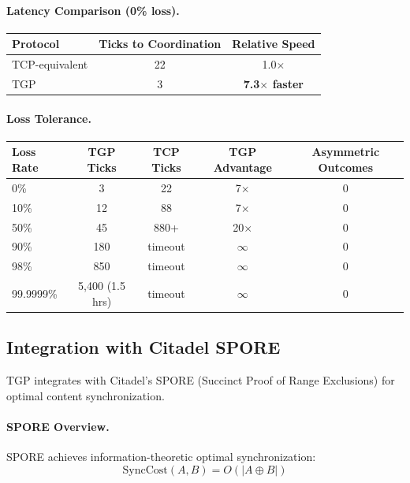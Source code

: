 \paragraph{Latency Comparison (0\% loss).}

\begin{center}
\begin{tabular}{lcc}
\toprule
Protocol & Ticks to Coordination & Relative Speed \\
\midrule
TCP-equivalent & 22 & 1.0$\times$ \\
TGP & 3 & \textbf{7.3$\times$ faster} \\
\bottomrule
\end{tabular}
\end{center}

\paragraph{Loss Tolerance.}

\begin{center}
\begin{tabular}{lcccc}
\toprule
Loss Rate & TGP Ticks & TCP Ticks & TGP Advantage & Asymmetric Outcomes \\
\midrule
0\% & 3 & 22 & 7$\times$ & 0 \\
10\% & 12 & 88 & 7$\times$ & 0 \\
50\% & 45 & 880+ & 20$\times$ & 0 \\
90\% & 180 & timeout & $\infty$ & 0 \\
98\% & 850 & timeout & $\infty$ & 0 \\
99.9999\% & 5,400 (1.5 hrs) & timeout & $\infty$ & 0 \\
\bottomrule
\end{tabular}
\end{center}

\subsection{Integration with Citadel SPORE}

TGP integrates with Citadel's SPORE (Succinct Proof of Range Exclusions) for optimal content synchronization.

\paragraph{SPORE Overview.}
SPORE achieves information-theoretic optimal synchronization:
\[
\text{SyncCost}(A, B) = O(|A \oplus B|)
\]

